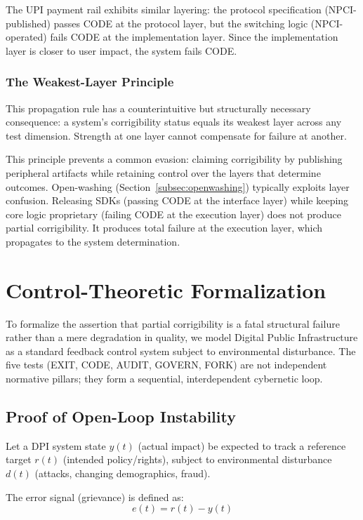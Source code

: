 \documentclass{article}
\begin{document}
The UPI payment rail exhibits similar layering: the protocol specification (NPCI-published) passes CODE at the protocol layer, but the switching logic (NPCI-operated) fails CODE at the implementation layer. Since the implementation layer is closer to user impact, the system fails CODE.

\subsubsection{The Weakest-Layer Principle}

This propagation rule has a counterintuitive but structurally necessary consequence: a system's corrigibility status equals its weakest layer across any test dimension. Strength at one layer cannot compensate for failure at another.

This principle prevents a common evasion: claiming corrigibility by publishing peripheral artifacts while retaining control over the layers that determine outcomes. Open-washing (Section~\ref{subsec:openwashing}) typically exploits layer confusion. Releasing SDKs (passing CODE at the interface layer) while keeping core logic proprietary (failing CODE at the execution layer) does not produce partial corrigibility. It produces total failure at the execution layer, which propagates to the system determination.

\section{Control-Theoretic Formalization}
\label{sec:formalization}

To formalize the assertion that partial corrigibility is a fatal structural failure rather than a mere degradation in quality, we model Digital Public Infrastructure as a standard feedback control system subject to environmental disturbance. The five tests (EXIT, CODE, AUDIT, GOVERN, FORK) are not independent normative pillars; they form a sequential, interdependent cybernetic loop.

\subsection{Proof of Open-Loop Instability}

Let a DPI system state $y(t)$ (actual impact) be expected to track a reference target $r(t)$ (intended policy/rights), subject to environmental disturbance $d(t)$ (attacks, changing demographics, fraud).

The error signal (grievance) is defined as:
\begin{equation}
e(t) = r(t) - y(t)
\end{equation}
\end{document}
